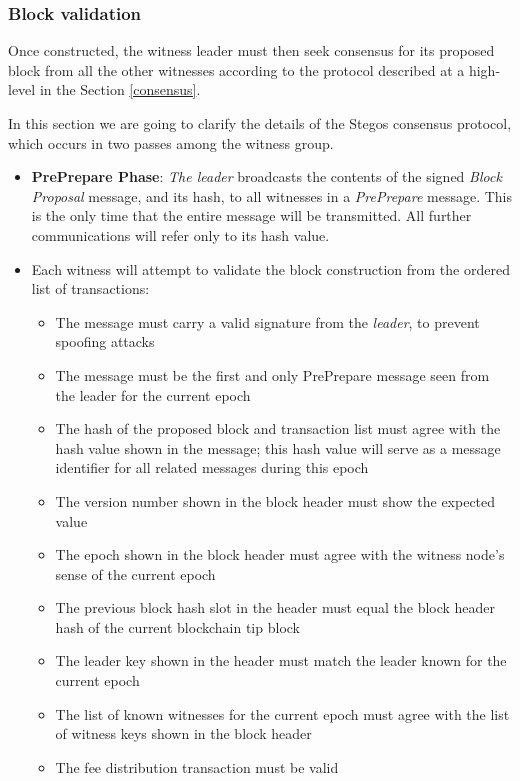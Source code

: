 \documentclass[a4paper, 10pt, conference]{ieeeconf}
\begin{document}
\subsubsection{Block validation} Once constructed, the witness leader must then seek consensus for its proposed block from all the other witnesses according to the protocol described at a high-level in the Section \ref{consensus}. 

In this section we are going to clarify the details of the Stegos consensus protocol, which occurs in two passes among the witness group.

\begin{itemize}
	\item {\textbf{PrePrepare Phase}: \textit{The leader} broadcasts the contents of the signed \textit{Block Proposal} message, and its hash, to all witnesses in a \textit{PrePrepare} message. This is the only time that the entire message will be transmitted. All further communications will refer only to its hash value.}
	\item {Each witness will attempt to validate the block construction from the ordered list of transactions:
		\begin{itemize}
			\item {The message must carry a valid signature from the \textit{leader}, to prevent spoofing attacks}
			\item {The message must be the first and only PrePrepare message seen from the leader for the current epoch}
			\item {The hash of the proposed block and transaction list must agree with the hash value shown in the message; this hash value will serve as a message identifier for all related messages during this epoch}
			\item {The version number shown in the block header must show the expected value}
			\item {The epoch shown in the block header must agree with the witness node's sense of the current epoch}
			\item {The previous block hash slot in the header must equal the block header hash of the current blockchain tip block}
			\item {The leader key shown in the header must match the leader known for the current epoch}
			\item {The list of known witnesses for the current epoch must agree with the list of witness keys shown in the block header}
			\item {The fee distribution transaction must be valid}

\end{itemize}}
\end{itemize}
\end{document}
